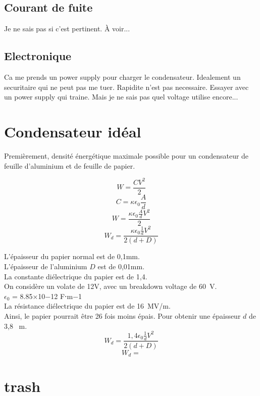 \documentclass[12 pt, a4paper]{report} %
\begin{document}
\subsection{Courant de fuite}

Je ne sais pas si c'est pertinent. À voir...

\subsection{Electronique}

Ca me prends un power supply pour charger le condensateur. Idealement un securitaire qui ne peut pas me tuer. Rapidite n'est pas necessaire. Essayer avec un power supply qui traine. Mais je ne sais pas quel voltage utilise encore...

\section{Condensateur idéal}

Premièrement, densité énergétique maximale possible pour un condensateur de feuille d'aluminium et de feuille de papier.

\[W = \frac{CV^{2}}{2}\]
\[C=\kappa\epsilon_{0}\frac{A}{d}\]
\[W = \frac{\kappa\epsilon_{0}\frac{A}{d}V^{2}}{2}\]
\begin{equation}
    W_{d} = \frac{\kappa\epsilon_{0}\frac{1}{d}V^{2}}{2(d+D)}
\end{equation}

L'épaisseur du papier normal est de 0,1mm. \\
L'épaisseur de l'aluminium $D$ est de 0,01mm.\\
La constante diélectrique du papier est de 1,4.\\
On considère un volate de 12V, avec un breakdown voltage de 60~V.\\
$\epsilon_{0}$ = 8.85×10−12 F⋅m−1\\
La résistance diélectrique du papier est de 16~MV/m.\\
Ainsi, le papier pourrait être 26 fois moins épais. Pour obtenir une épaisseur $d$ de 3,8 \si{\mu m}.\\

\begin{equation}
    W_{d} = \frac{1,4\epsilon_{0}\frac{1}{d}V^{2}}{2(d+D)}
\end{equation}
\[W_{d} = \]

\section{trash}
\end{document}
